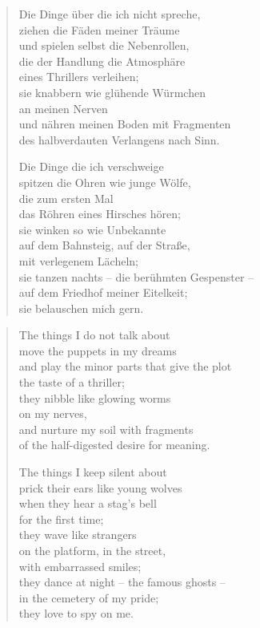 
\cleartoverso


\begin{verse}

Die Dinge über die ich nicht spreche,\\
ziehen die Fäden meiner Träume\\
und spielen selbst die Nebenrollen,\\
die der Handlung die Atmosphäre\\
eines Thrillers verleihen;\\
sie knabbern wie glühende Würmchen\\
an meinen Nerven\\
und nähren meinen Boden mit Fragmenten\\
des halbverdauten Verlangens nach Sinn.

Die Dinge die ich verschweige\\
spitzen die Ohren wie junge Wölfe,\\
die zum ersten Mal\\
das Röhren eines Hirsches hören;\\
sie winken so wie Unbekannte\\
auf dem Bahnsteig, auf der Straße,\\
mit verlegenem Lächeln;\\
sie tanzen nachts -- die berühmten Gespenster --\\
auf dem Friedhof meiner Eitelkeit;\\
sie belauschen mich gern.
\end{verse}

\clearpage


\begin{verse}
The things I do not talk about\\
move the puppets in my dreams\\
and play the minor parts that give the plot\\
the taste of a thriller;\\
they nibble like glowing worms\\
on my nerves,\\
and nurture my soil with fragments\\
of the half-digested desire for meaning.

The things I keep silent about\\
prick their ears like young wolves\\
when they hear a stag's bell\\
for the first time;\\
they wave like strangers\\
on the platform, in the street,\\
with embarrassed smiles;\\
they dance at night -- the famous ghosts --\\
in the cemetery of my pride;\\
they love to spy on me.
\end{verse}

